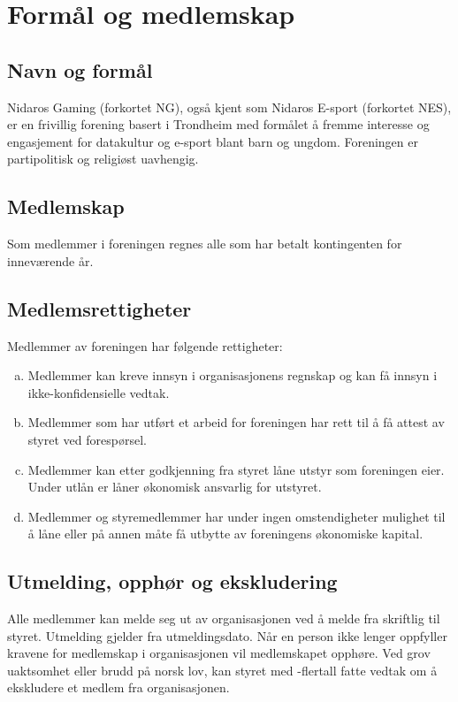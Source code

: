 \chapter{Formål og medlemskap}

\emptychapterspacing

\section{Navn og formål}
Nidaros Gaming (forkortet NG), også kjent som Nidaros E-sport (forkortet NES), er en frivillig forening basert i Trondheim med formålet å fremme interesse og engasjement for datakultur og e-sport blant barn og ungdom. Foreningen er partipolitisk og religiøst uavhengig.

\section{Medlemskap}
Som medlemmer i foreningen regnes alle som har betalt kontingenten for inneværende år.

\section{Medlemsrettigheter}
Medlemmer av foreningen har følgende rettigheter:
\begin{enumerate}[a.]
    \item Medlemmer kan kreve innsyn i organisasjonens regnskap og kan få innsyn i ikke-konfiden\-sielle vedtak.
    \item Medlemmer som har utført et arbeid for foreningen har rett til å få attest av styret ved forespørsel.
    \item Medlemmer kan etter godkjenning fra styret låne utstyr som foreningen eier. Under utlån er låner økonomisk ansvarlig for utstyret.
    \item Medlemmer og styremedlemmer har under ingen omstendigheter mulighet til å låne eller på annen måte få utbytte av foreningens økonomiske kapital.
\end{enumerate}

\section{Utmelding, opphør og ekskludering}
Alle medlemmer kan melde seg ut av organisasjonen ved å melde fra skriftlig til styret. Utmelding gjelder fra utmeldingsdato. Når en person ikke lenger oppfyller kravene for medlemskap i organisasjonen vil medlemskapet opphøre. Ved grov uaktsomhet eller brudd på norsk lov, kan styret med -flertall fatte vedtak om å ekskludere et medlem fra organisasjonen.
